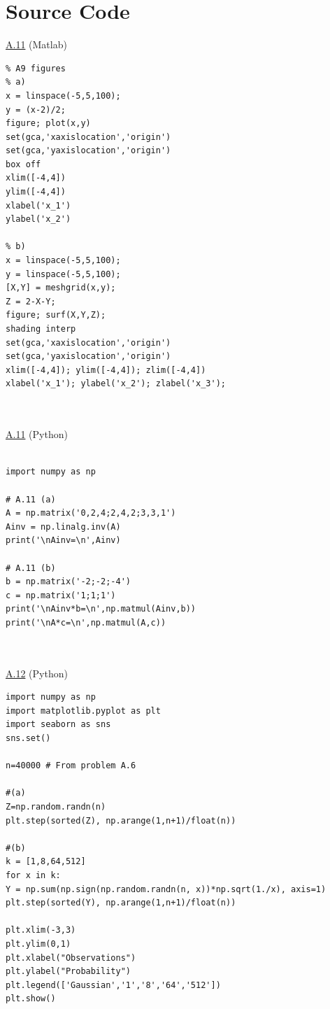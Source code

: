 \documentclass{article}
\newcommand{\1}{\mathbf{1}}
\begin{document}
\section*{Source Code}

\underline{A.11} (Matlab) 
\begin{verbatim}
% A9 figures
% a)
x = linspace(-5,5,100);
y = (x-2)/2;
figure; plot(x,y)
set(gca,'xaxislocation','origin')
set(gca,'yaxislocation','origin')
box off
xlim([-4,4])
ylim([-4,4])
xlabel('x_1')
ylabel('x_2')

% b)
x = linspace(-5,5,100);
y = linspace(-5,5,100);
[X,Y] = meshgrid(x,y);
Z = 2-X-Y;
figure; surf(X,Y,Z);
shading interp
set(gca,'xaxislocation','origin')
set(gca,'yaxislocation','origin')
xlim([-4,4]); ylim([-4,4]); zlim([-4,4])
xlabel('x_1'); ylabel('x_2'); zlabel('x_3');
\end{verbatim}

\hfill \\ 
\hfill \\
\underline{A.11} (Python)
\begin{verbatim}

import numpy as np

# A.11 (a)
A = np.matrix('0,2,4;2,4,2;3,3,1')
Ainv = np.linalg.inv(A)
print('\nAinv=\n',Ainv)

# A.11 (b)
b = np.matrix('-2;-2;-4')
c = np.matrix('1;1;1')
print('\nAinv*b=\n',np.matmul(Ainv,b))
print('\nA*c=\n',np.matmul(A,c))
\end{verbatim}

\hfill \\ 
\hfill \\
\underline{A.12} (Python)
\begin{verbatim}
import numpy as np
import matplotlib.pyplot as plt
import seaborn as sns
sns.set()

n=40000 # From problem A.6

#(a)
Z=np.random.randn(n)
plt.step(sorted(Z), np.arange(1,n+1)/float(n))

#(b)
k = [1,8,64,512]
for x in k:
Y = np.sum(np.sign(np.random.randn(n, x))*np.sqrt(1./x), axis=1)
plt.step(sorted(Y), np.arange(1,n+1)/float(n))

plt.xlim(-3,3)
plt.ylim(0,1)
plt.xlabel("Observations")
plt.ylabel("Probability")
plt.legend(['Gaussian','1','8','64','512'])	
plt.show()
\end{verbatim}
\end{document}
